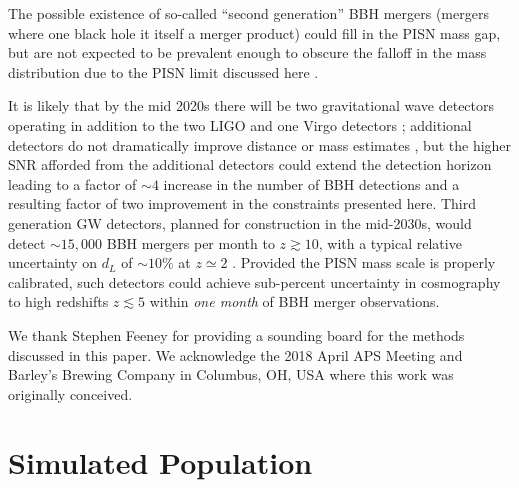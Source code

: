 \documentclass[modern]{aastex62}
\begin{document}
The possible existence of so-called ``second generation'' \ac{BBH} mergers
(mergers where one black hole it itself a merger product) could fill in the
\ac{PISN} mass gap, but are not expected to be prevalent enough to obscure the
falloff in the mass distribution due to the \ac{PISN} limit discussed here
\cite{Rodriguez2019}.

It is likely that by the mid 2020s there will be two gravitational wave
detectors operating in addition to the two LIGO and one Virgo detectors
\cite{ObsScenarios}; additional detectors do not dramatically improve distance
or mass estimates \citep{Vitale2017}, but the higher SNR afforded from the
additional detectors could extend the detection horizon leading to a factor of
$\sim 4$ increase in the number of \ac{BBH} detections and a resulting factor of
two improvement in the constraints presented here.  Third generation \ac{GW}
detectors, planned for construction in the mid-2030s, would detect $\sim 15,000$
\ac{BBH} mergers per month to $z \gtrsim 10$, with a typical relative
uncertainty on $d_L$ of $\sim 10 \%$ at $z \simeq 2$ \citep{Vitale2018}.
Provided the \ac{PISN} mass scale is properly calibrated, such detectors could
achieve sub-percent uncertainty in cosmography to high redshifts $z \lesssim 5$
within \emph{one month} of \ac{BBH} merger observations.

\acknowledgments

We thank Stephen Feeney for providing a sounding board for the methods discussed
in this paper.  We acknowledge the 2018 April APS Meeting and Barley's Brewing
Company in Columbus, OH, USA where this work was originally conceived.



\appendix

\setcounter{figure}{0}
\renewcommand{\figurename}{Extended Data Figure}
\renewcommand{\tablename}{Extended Data Table}

\section{Simulated Population}
\label{sec:simulated-population}
\end{document}
